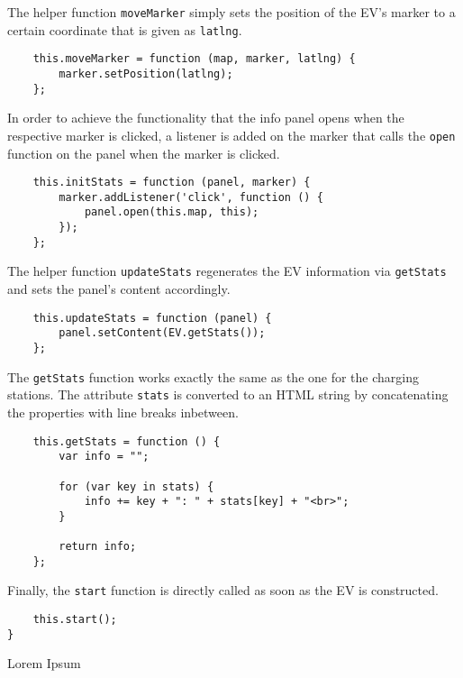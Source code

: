 The helper function \texttt{moveMarker} simply sets the position of the EV's marker to a certain coordinate that is given as \texttt{latlng}.

\begin{verbatim}
    this.moveMarker = function (map, marker, latlng) {
        marker.setPosition(latlng);
    };
\end{verbatim}

In order to achieve the functionality that the info panel opens when the respective marker is clicked, a listener is added on the marker that calls the \texttt{open} function on the panel when the marker is clicked.

\begin{verbatim}
    this.initStats = function (panel, marker) {
        marker.addListener('click', function () {
            panel.open(this.map, this);
        });
    };
\end{verbatim}

The helper function \texttt{updateStats} regenerates the EV information via \texttt{getStats} and sets the panel's content accordingly.

\begin{verbatim}
    this.updateStats = function (panel) {
        panel.setContent(EV.getStats());
    };
\end{verbatim}

The \texttt{getStats} function works exactly the same as the one for the charging stations. The attribute \texttt{stats} is converted to an HTML string by concatenating the properties with line breaks inbetween.

\begin{verbatim}
    this.getStats = function () {
        var info = "";

        for (var key in stats) {
            info += key + ": " + stats[key] + "<br>";
        }

        return info;
    };
\end{verbatim}

Finally, the \texttt{start} function is directly called as soon as the EV is constructed.

\begin{verbatim}
    this.start();
}
\end{verbatim}

Lorem Ipsum

